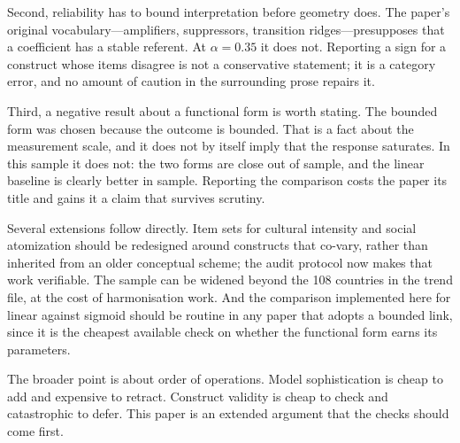 \documentclass[11pt]{article}
\begin{document}
Second, reliability has to bound interpretation before geometry does. The paper's original vocabulary---amplifiers, suppressors, transition ridges---presupposes that a coefficient has a stable referent. At $\alpha=0.35$ it does not. Reporting a sign for a construct whose items disagree is not a conservative statement; it is a category error, and no amount of caution in the surrounding prose repairs it.

Third, a negative result about a functional form is worth stating. The bounded form was chosen because the outcome is bounded. That is a fact about the measurement scale, and it does not by itself imply that the response saturates. In this sample it does not: the two forms are close out of sample, and the linear baseline is clearly better in sample. Reporting the comparison costs the paper its title and gains it a claim that survives scrutiny.

Several extensions follow directly. Item sets for cultural intensity and social atomization should be redesigned around constructs that co-vary, rather than inherited from an older conceptual scheme; the audit protocol now makes that work verifiable. The sample can be widened beyond the 108 countries in the trend file, at the cost of harmonisation work. And the comparison implemented here for linear against sigmoid should be routine in any paper that adopts a bounded link, since it is the cheapest available check on whether the functional form earns its parameters.

The broader point is about order of operations. Model sophistication is cheap to add and expensive to retract. Construct validity is cheap to check and catastrophic to defer. This paper is an extended argument that the checks should come first.

\printbibliography[title={References}]
\end{document}
